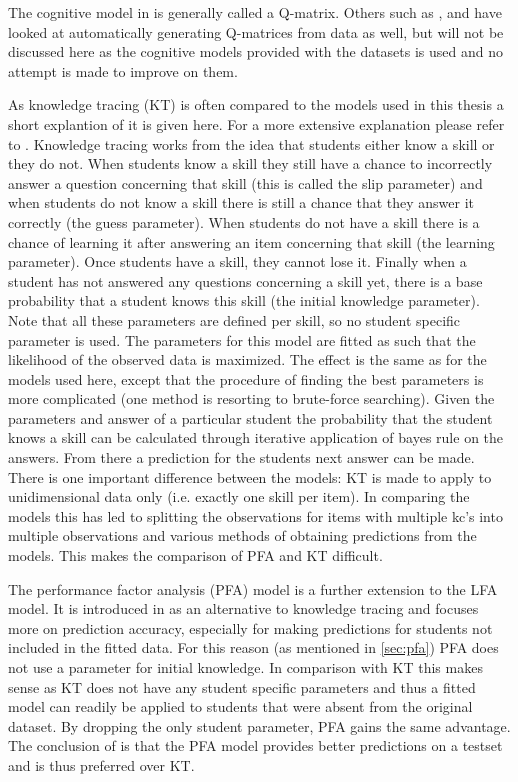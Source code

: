 \documentclass{scrartcl}
\begin{document}
The cognitive model in \cite{lfa} is generally called a Q-matrix. Others such as \cite{matrixfact}, \cite{qm1} and \cite{qm2} have looked at automatically generating Q-matrices from data as well, but will not be discussed here as the cognitive models provided with the datasets is used and no attempt is made to improve on them.

As knowledge tracing (KT) is often compared to the models used in this thesis a short explantion of it is given here. For a more extensive explanation please refer to \cite{kt}. Knowledge tracing works from the idea that students either know a skill or they do not. When students know a skill they still have a chance to incorrectly answer a question concerning that skill (this is called the slip parameter) and when students do not know a skill there is still a chance that they answer it correctly (the guess parameter). When students do not have a skill there is a chance of learning it after answering an item concerning that skill (the learning parameter). Once students have a skill, they cannot lose it. Finally when a student has not answered any questions concerning a skill yet, there is a base probability that a student knows this skill (the initial knowledge parameter). Note that all these parameters are defined per skill, so no student specific parameter is used. The parameters for this model are fitted as such that the likelihood of the observed data is maximized. The effect is the same as for the models used here, except that the procedure of finding the best parameters is more complicated (one method is resorting to brute-force searching). Given the parameters and answer of a particular student the probability that the student knows a skill can be calculated through iterative application of bayes rule on the answers. From there a prediction for the students next answer can be made. There is one important difference between the models: KT is made to apply to unidimensional data only (i.e. exactly one skill per item). In comparing the models this has led to splitting the observations for items with multiple kc's into multiple observations and various methods of obtaining predictions from the models. This makes the comparison of PFA and KT difficult.

The performance factor analysis (PFA) model is a further extension to the LFA model. It is introduced in \cite{pfa} as an alternative to knowledge tracing and focuses more on prediction accuracy, especially for making predictions for students not included in the fitted data. For this reason (as mentioned in \ref{sec:pfa}) PFA does not use a parameter for initial knowledge. In comparison with KT this makes sense as KT does not have any student specific parameters and thus a fitted model can readily be applied to students that were absent from the original dataset. By dropping the only student parameter, PFA gains the same advantage. The conclusion of \cite{pfa} is that the PFA model provides better predictions on a testset and is thus preferred over KT.
\end{document}

